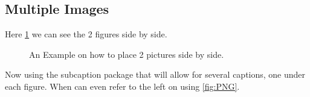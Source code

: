 \documentclass[12pt, a4paper,twoside]{article}
\begin{document}
\subsection{Multiple Images}

Here \ref{fig:side} we can see the 2 figures side by side.

\begin{figure}[ht]
\centering
{}
\hspace{\fill}
\caption{An Example on how to place 2 pictures side by side.}
\label{fig:side}
\end{figure}

 Now using the subcaption package that will allow for several captions, one under each figure. When can even refer to the left on using \ref{fig:PNG}.
\end{document}
